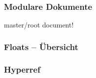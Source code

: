 \documentclass{beamer}                %
\begin{document}
\begin{frame} %
    \frametitle{Modulare Dokumente}
    master/root document!
\end{frame}%

\begin{frame} %
    \frametitle{Floats -- \"Ubersicht}
\end{frame}%

\begin{frame} %
    \frametitle{Hyperref}
\end{frame}%

\end{document}
